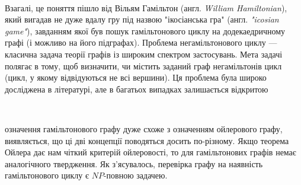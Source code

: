 \documentclass[14pt]{article}
\begin{document}
\begin{spacing}{1.175}
        \\
        \quad Взагалі, це поняття пішло від Вільям Гамільтон (англ. \textit{William Hamiltonian}), який вигадав не дуже вдалу гру під назвою "ікосіанська гра" (англ. \textit{"icosian game"}), завданням якої був пошук гамільтонового циклу на додекаедричному графі (і можливо на його підграфах). Проблема негамільтонового циклу — класична задача теорії графів із широким спектром застосувань. Мета задачі полягає в тому, щоб визначити, чи містить заданий граф негамільтонів цикл (цикл, у якому відвідуються не всі вершини). Ця проблема була широко досліджена в літературі, але в багатьох випадках залишається відкритою \\
        \begin{center}

        \\
        \end{center}
        
         означення гамільтонового графу дуже схоже з означенням ойлерового графу, виявляється, що ці дві концепції поводяться досить по-різному. Якщо теорема Ойлера дає нам чіткий критерій ойлеровості, то для гамільтонових графів немає аналогічного твердження. Як з'ясувалось, перевірка графу на наявність гамільтонового циклу є \(NP\)-повною задачею.


\end{spacing}
\end{document}

